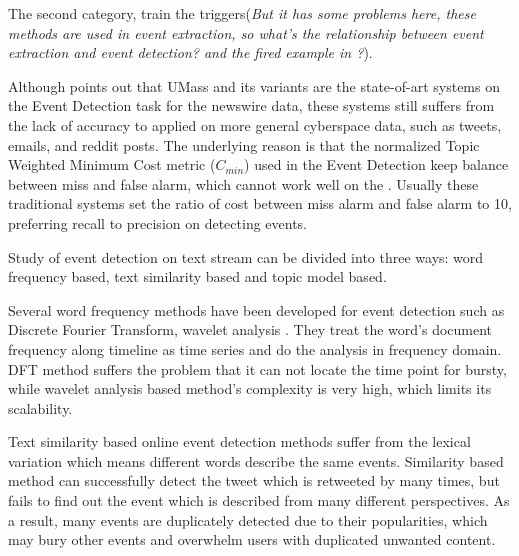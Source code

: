 \documentclass[11pt]{article}
\begin{document}
The second category, train the triggers\cite{Li2013JointEE}\cite{Nguyen2015EventDA}(\textit{But it has some problems here, these methods are used in event extraction, so what's the relationship between event extraction and event detection? and the fired example in \cite{Li2013JointEE}?}). 


Although \cite{Wurzer:2015wq} points out that UMass\cite{Allan:2000wu} and its variants\cite{Petrovic:2010uj}\cite{petrovic2012using}\cite{Wurzer:2015wq} are the state-of-art systems on the Event Detection task for the newswire data, these systems still suffers from the lack of accuracy to applied on more general cyberspace data, such as tweets, emails, and reddit posts. 
The underlying reason is that the normalized Topic Weighted Minimum Cost metric (\(C_{min}\)) used in the Event Detection keep balance between miss and false alarm, which cannot work well on the .
Usually these traditional systems set the ratio of cost between miss alarm and false alarm to 10, preferring recall to precision on detecting events.

Study of event detection on text stream can be divided into three ways: word frequency based, text similarity based and topic model based.

Several word frequency methods have been developed for event detection such as Discrete Fourier Transform\cite{he2007analyzingDFT}, wavelet analysis \cite{weng2011eventWavelet}.
They treat the word's document frequency along timeline as time series and do the analysis in frequency domain. 
DFT method suffers the problem that it can not locate the time point for bursty, while wavelet analysis based method's complexity is very high, which limits its scalability. 

 Text similarity based online event detection methods\cite{petrovic2010streaming}\cite{mccreadie2013scalable}  suffer from the lexical variation which means different words describe the same events.
 Similarity based method can successfully detect the tweet which is retweeted by many times, but fails to find out the event which is described from many different perspectives.
 As a result, many events are duplicately detected due to their popularities, which may bury other events and overwhelm users with duplicated unwanted content.
\end{document}
